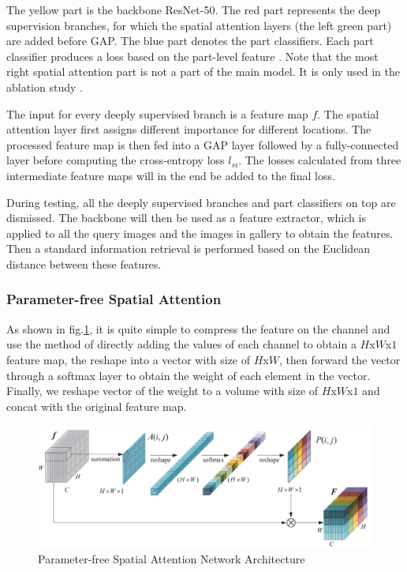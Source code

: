 The yellow part is the backbone ResNet-50. The red part represents the deep supervision branches, for which the spatial attention layers (the left green part) are added before GAP. The blue part denotes the part classifiers. Each part classifier produces a loss based on the part-level feature \cite{SA}. Note that the most right spatial attention part is not a part of the main model. It is only used in the ablation study \cite{SA}.\par
The input for every deeply supervised branch is a feature map $f$. The spatial attention layer first assigns different importance for different locations. The processed feature map is then fed into a GAP layer followed by a fully-connected layer before computing the cross-entropy loss $l_{si}$\cite{SA}. The losses calculated from three intermediate feature maps will in the end be added to the final loss\cite{SA}.\par
During testing, all the deeply supervised branches and
part classifiers on top are dismissed. The backbone will then
be used as a feature extractor, which is applied to all the
query images and the images in gallery to obtain the features. Then a standard information retrieval is performed
based on the Euclidean distance between these features.
\subsubsection{Parameter-free Spatial Attention}
\hspace{0.5cm}As shown in fig.\ref{fig:sa}, it is quite simple to compress the feature on the channel and use the method of directly adding the values of each channel to obtain a $H$x$W$x$1$ feature map, the reshape into a vector with size of $H$x$W$, then forward the vector through a softmax layer to obtain the weight of each element in the vector. Finally, we reshape vector of the weight to a volume with size of $H$x$W$x$1$ and concat with the original feature map.

\begin{figure}[h!]
    \centering
    \includegraphics[scale=0.4]{Chapters/Fig/attention_sa.PNG}
    \caption{Parameter-free Spatial Attention Network Architecture}
    \label{fig:sa}
\end{figure}

